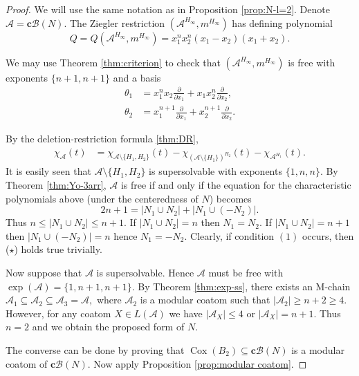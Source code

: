 \documentclass[11pt]{article}
\theoremstyle{definition}
\numberwithin{equation}{section}
\DeclareMathOperator{\Cox}{Cox}
\newcommand{\A}{\mathcal{A}}
\newcommand{\B}{\mathcal{B}}
\newcommand{\tbf}{\textbf}
\begin{document}
\begin{proof}
We will use the same notation as in Proposition \ref{prop:N-l=2}. 
Denote $ \mathcal{A}=\tbf{c}\B(N)$. 
The Ziegler restriction $(\A^{H_{\infty}}, m^{H_{\infty}})$ has defining polynomial 
$$Q = Q(\A^{H_{\infty}}, m^{H_{\infty}}) =x_{1}^{n}x_{2}^{n} (x_1-x_2)(x_1+x_2).$$

We may use Theorem \ref{thm:criterion} to check that $(\A^{H_{\infty}}, m^{H_{\infty}})$ is free with  exponents $\{n+1 , n+1\}$ and a basis
 \begin{align*}
\theta_1  & =x_{1}^{n}x_2 \frac{\partial}{\partial x_1} + x_{1}  x_{2}^{n}  \frac{\partial}{\partial x_2},\\
\theta_2  & = x_{1}^{n+1} \frac{\partial}{\partial x_1} +   x_{2}^{n+1}  \frac{\partial}{\partial x_2}.
\end{align*}
       
By the deletion-restriction formula \ref{thm:DR}, 
\begin{align*}
{\chi}_\mathcal{A}(t)  & = {\chi}_{\mathcal{A} \setminus \{H_1,H_2\}}( t)-{\chi}_{(\mathcal{A} \setminus \{H_1\})^{H_2}} ( t)-{\chi}_{\mathcal{A}^{H_1}}( t).
\end{align*}
It is easily seen that $\mathcal{A} \setminus \{H_1,H_2\}$ is supersolvable with exponents $\{1, n,n\}$. 
By Theorem \ref{thm:Yo-3arr}, $ \mathcal{A}$ is free  if and only if  the equation for the characteristic polynomials above  (under the centeredness of $N$) becomes 
\begin{equation}
 \label{eq:E}\tag{$\star$}
2n+1 = |N_1 \cup N_2| + |N_1 \cup (-N_2)|.
\end{equation}
Thus $n \le  |N_1 \cup N_2|  \le n+1$. 
If $ |N_1 \cup N_2|=n$ then $N_1 =N_2$. 
If $ |N_1 \cup N_2| = n+1$ then $ |N_1 \cup (-N_2)|=n$ hence $N_1 =-N_2$. 
Clearly, if condition $(1)$ occurs, then ($\star$) holds true trivially. 


Now suppose that  $ \mathcal{A}$ is  supersolvable. 
Hence $\A$ must be free with  $\exp(\A) = \{1,n+1,n+1\}$. 
By  Theorem \ref{thm:exp-ss}, there exists an M-chain $ \mathcal{A}_{1} \subseteq \mathcal{A}_{2} \subseteq \mathcal{A}_{3} = \A,$ where $\A_2$ is a modular coatom such that $|\A_{2}|  \ge n+2 \ge 4$. 
However, for any coatom $X \in L(\A)$ we have $|\A_X| \le 4$ or $|\A_X| =n+1$. 
Thus $n=2$ and we obtain the proposed form of $N$. 

The converse can be done by proving that $ \Cox(B_2)  \subseteq  \tbf{c}\B(N)$ is a modular coatom of $\tbf{c}\B(N)$. 
Now apply  Proposition \ref{prop:modular coatom}. 
\end{proof}
\end{document}
